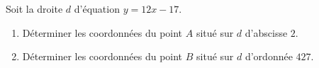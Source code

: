 
\begin{exercice}\label{exosmath-0611}

    Soit la droite \( d\) d'équation \( y=12x-17\).
    \begin{enumerate}
        \item
            Déterminer les coordonnées du point \( A\) situé sur \( d\) d'abscisse \( 2\).
        \item
            Déterminer les coordonnées du point \( B\) situé sur \( d\) d'ordonnée \( 427\).
    \end{enumerate}

\end{exercice}
